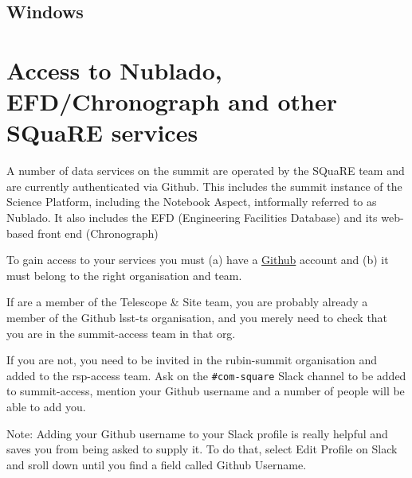 \newpage

  \subsection{Windows}

 
  




\newpage
\section{Access to Nublado, EFD/Chronograph and other SQuaRE services}
\label{sec:Nublado}

A number of data services on the summit are operated by the SQuaRE team and are currently authenticated via Github.
This includes the summit instance of the Science Platform, including the Notebook Aspect, intformally referred to as Nublado.
It also includes the EFD (Engineering Facilities Database) and its web-based front end (Chronograph)

To gain access to your services you must (a) have a \href{https://github.com}{Github} account and (b) it must belong to the right organisation and team.

If are a member of the Telescope \& Site team, you are probably already a member of the Github lsst-ts organisation, and you merely need to check that you are in the summit-access team in that org.

If you are not, you need to be invited in the rubin-summit organisation and added to the rsp-access team. Ask on the \verb|#com-square| Slack channel to be added to summit-access, mention your Github username and a number of people will be able to add you.

Note: Adding your Github username to your Slack profile is really helpful and saves you from being asked to supply it. To do that, select Edit Profile on Slack and sroll down until you find a field called Github Username.

